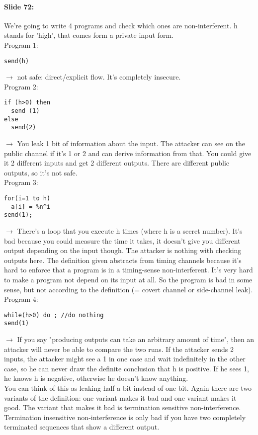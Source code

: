 \documentclass[10pt,a4paper]{report}
\begin{document}
\paragraph{Slide 72:} We're going to write 4 programs and check which ones are non-interferent. h stands for 'high', that comes form a private input form. \\
Program 1:
\begin{verbatim}
send(h)
\end{verbatim}
$\rightarrow$ not safe: direct/explicit flow. It's completely insecure.\\
Program 2:
\begin{verbatim}
if (h>0) then
  send (1)
else
  send(2)
\end{verbatim}
$\rightarrow$ You leak 1 bit of information about the input. The attacker can see on the public channel if it's 1 or 2 and can derive information from that. You could give it 2 different inputs and get 2 different outputs. There are different public outputs, so it's not safe.\\
Program 3:
\begin{verbatim}
for(i=1 to h)
  a[i] = %n^i
send(1);
\end{verbatim}
$\rightarrow$ There's a loop that you execute h times (where h is a secret number). It's bad because you could measure the time it takes, it doesn't give you different output depending on the input though. The attacker is nothing with checking outputs here. The definition given abstracts from timing channels because it's hard to enforce that a program is in a timing-sense non-interferent. It's very hard to make a program not depend on its input at all. So the program is bad in some sense, but not according to the definition (= covert channel or side-channel leak).\\
Program 4:
\begin{verbatim}
while(h>0) do ; //do nothing
send(1)
\end{verbatim}
$\rightarrow$ If you say "producing outputs can take an arbitrary amount of time", then an attacker will never be able to compare the two runs. If the attacker sends 2 inputs, the attacker might see a 1 in one case and wait indefinitely in the other case, so he can never draw the definite conclusion that h is positive. If he sees 1, he knows h is negative, otherwise he doesn't know anything. \\ 
You can think of this as leaking half a bit instead of one bit. Again there are two variants of the definition: one variant makes it bad and one variant makes it good.
The variant that makes it bad is termination sensitive non-interference. Termination insensitive non-interference is only bad if you have two completely terminated sequences that show a different output.
\end{document}
